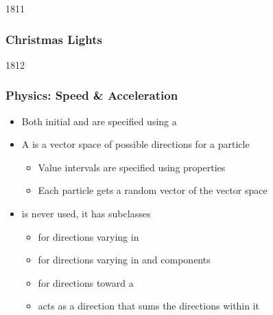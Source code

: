 
\begin{slide}{1811}\frametitle{Christmas Lights}


\vspace*{-20em}\hfill{}
\end{slide}


\begin{slide}{1812}\frametitle{Physics: Speed \& Acceleration}

\begin{itemize}
\item Both initial  and  are specified using a 
\vspace*{0.5em}
\item A  is a vector space of possible directions for a particle
  \begin{itemize}
  \item Value intervals are specified using  properties
  \item Each particle gets a random vector of the vector space
  \end{itemize}
\vspace*{0.5em}
\item {} is never used, it has subclasses
  \begin{itemize}
  \item {} for directions varying in 
  \item {} for directions varying in  and  components
  \item {} for directions toward a 
  \item {} acts as a direction that sums the directions within it
  \end{itemize}
\end{itemize}

\end{slide}


